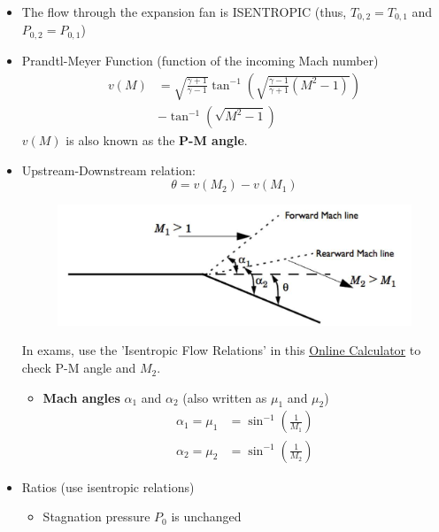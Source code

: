 \begin{itemize}
    \item The flow through the expansion fan is {\color{blue}ISENTROPIC} (thus, $T_{0,2}=T_{0,1}$ and $P_{0,2}=P_{0,1}$)
    \item Prandtl-Meyer Function (function of the incoming Mach number)
    \begin{align*}
        v(M) &= \sqrt{\frac{\gamma+1}{\gamma-1}}\tan^{-1}\left(\sqrt{\frac{\gamma-1}{\gamma+1}(M^2-1)}\right) \\
        &- \tan^{-1}\left(\sqrt{M^2-1}\right)
    \end{align*}
    $v(M)$ is also known as the \textbf{P-M angle}.
    \item Upstream-Downstream relation:
    \begin{equation*}
        \theta = v(M_2) - v(M_1)
    \end{equation*}
    \begin{figure}[H]
        \centering
        \includegraphics[width=1.0\linewidth]{images/expansion_wave_up_downstream.png}
    \end{figure}
    In exams, use the 'Isentropic Flow Relations' in this \href{http://www.dept.aoe.vt.edu/~devenpor/aoe3114/calc.html}{\color{blue}\underline{Online Calculator}\color{black}} to check P-M angle and $M_2$.
    \begin{itemize}
        \item \textbf{Mach angles} $\alpha_1$ and $\alpha_2$ (also written as $\mu_1$ and $\mu_2$)
        \begin{align*}
            \alpha_1 = \mu_1 &= \sin^{-1}\left(\frac{1}{M_1}\right) \\
            \alpha_2 = \mu_2 &= \sin^{-1}\left(\frac{1}{M_2}\right)
        \end{align*}
    \end{itemize}
    \item Ratios (use isentropic relations)
    \begin{itemize}
        \item Stagnation pressure $P_0$ is {\color{blue}unchanged}

\end{itemize}
\end{itemize}
